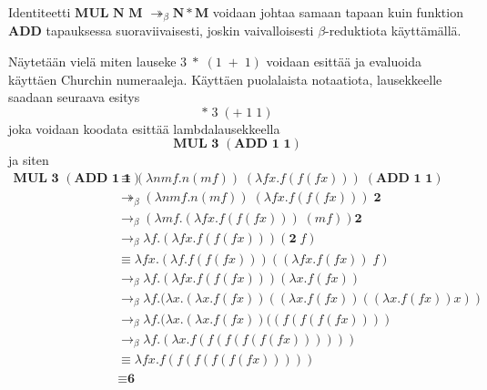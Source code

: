 Identiteetti $\textbf{MUL N M } \twoheadrightarrow_{\beta}\textbf{N} * \textbf{M}$ voidaan johtaa samaan tapaan kuin funktion \textbf{ADD} tapauksessa suoraviivaisesti, joskin vaivalloisesti $\beta$-reduktiota käyttämällä. 
\par
Näytetään vielä miten lauseke $3 \; * \; (1  \; + \; 1)$ voidaan esittää ja evaluoida käyttäen Churchin numeraaleja. Käyttäen puolalaista notaatiota, lausekkeelle saadaan seuraava esitys
\[* \; 3 \; (+ \; 1 \; 1) \] 
joka voidaan koodata esittää lambdalausekkeella
\[ \textbf{MUL 3 }(\textbf{ADD 1 1}) \]
ja siten
\begin{align*}
\textbf{MUL 3 }(\textbf{ADD 1 1}) &\equiv (\lambda n m f . n (mf))  \; (\lambda f x . f(f(fx))) \;(\textbf{ADD 1 1}) \\
&\twoheadrightarrow_{\beta} (\lambda n m f . n (mf) ) \; (\lambda f x . f(f(fx))) \; \textbf{2} \\
&\rightarrow_{\beta} (\lambda m f . (\lambda f x . f(f(fx))) \; (m f)) \textbf{2}    \\
&\rightarrow_{\beta} \lambda f . (\lambda f x . f(f(fx))) (\textbf{2} \; f) \\
&\equiv \lambda f x . (\lambda f . f(f(fx))) ((\lambda f x . f (f x)) \; f) \\
&\rightarrow_{\beta} \lambda f . (\lambda f x .  f(f(fx))) (\lambda x . f (f x)) \\
&\rightarrow_{\beta} \lambda f . (\lambda x .  (\lambda x . f (f x))((\lambda x . f (f x))((\lambda x . f (f x))x))\\
&\rightarrow_{\beta} \lambda f . (\lambda x .  (\lambda x . f (f x))((f (f( f( f x))))  \\
&\rightarrow_{\beta} \lambda f . (\lambda x . f( f (f (f( f( f x)))))) \\
&\equiv \lambda f x. f( f (f (f( f( f x))))) \\
&\equiv \textbf{6}
\end{align*} 

